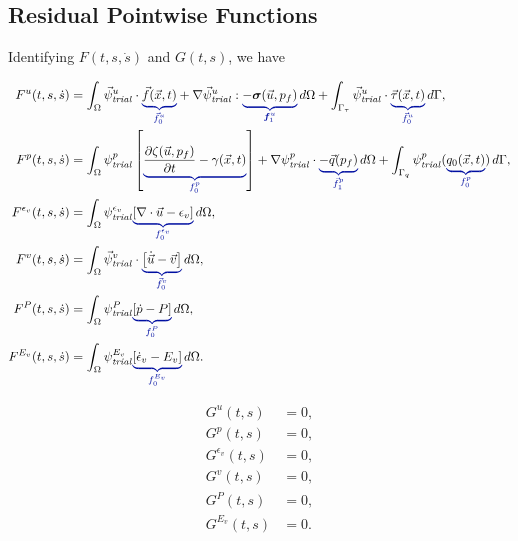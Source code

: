 \subsection{Residual Pointwise Functions}

Identifying $F(t,s,\dot{s})$ and $G(t,s)$, we have

\begin{align}
    F^u(t,s,\dot{s})              & = \int_\Omega \trialvec[u] \cdot \eqnannotate{\vec{f}(\vec{x},t)}{\vec{f}^u_0}
    + \nabla \trialvec[u] : \eqnannotate{-\tensor{\sigma}(\vec{u},p_f)}{\tensor{f}^u_1} \, d\Omega
    + \int_{\Gamma_\tau} \trialvec[u] \cdot \eqnannotate{\vec{\tau}(\vec{x},t)}{\vec{f}^u_0} \, d\Gamma,                                                                             \\
    F^p(t,s,\dot{s})              & = \int_\Omega  \trialscalar[p] \left[\eqnannotate{\frac{\partial \zeta(\vec{u},p_f)}{\partial t} - \gamma(\vec{x},t)} {f^p_0}\right]
    + \nabla \trialscalar[p] \cdot \eqnannotate{-\vec{q}(p_f)}{\vec{f}^p_1} \, d\Omega
    + \int_{\Gamma_q} \trialscalar[p] (\eqnannotate{q_0(\vec{x},t)}{f^p_0}) \, d\Gamma,                                                                                              \\
    F^{\epsilon_{v}}(t,s,\dot{s}) & = \int_{\Omega} \trialscalar[\epsilon_{v}] \eqnannotate{ \left[\nabla \cdot \vec{u} - \epsilon_{v} \right] }{ f^{\epsilon_{v}}_{0} } \, d\Omega, \\
    F^v(t,s,\dot{s})              & = \int_{\Omega} \trialvec[v] \cdot \eqnannotate{ \left[ \dot{\vec{u}} - \vec{v} \right] }{ \vec{f}^{v}_{0} } \, d\Omega,                         \\
    F^{P}(t,s,\dot{s})            & = \int_{\Omega} \trialscalar[P] \eqnannotate{\left[ \dot{p} - P \right]}{ f^{ P }_{0} } \, d\Omega,                                              \\
    F^{E_{v}}(t,s,\dot{s})        & = \int_{\Omega} \trialscalar[E_{v}] \eqnannotate{\left[ \dot{\epsilon}_{v} - E_{v} \right]}{f^{E_{v}}_{0}} \, d\Omega.                           \\
\end{align}

\begin{align}
    G^u(t,s)            & = 0, \\
    G^p(t,s)            & = 0, \\
    G^{\epsilon_v}(t,s) & = 0, \\
    G^{v}(t,s)          & = 0, \\
    G^{P}(t,s)          & =0,  \\
    G^{E_{v}}(t,s)      & =0.
\end{align}

